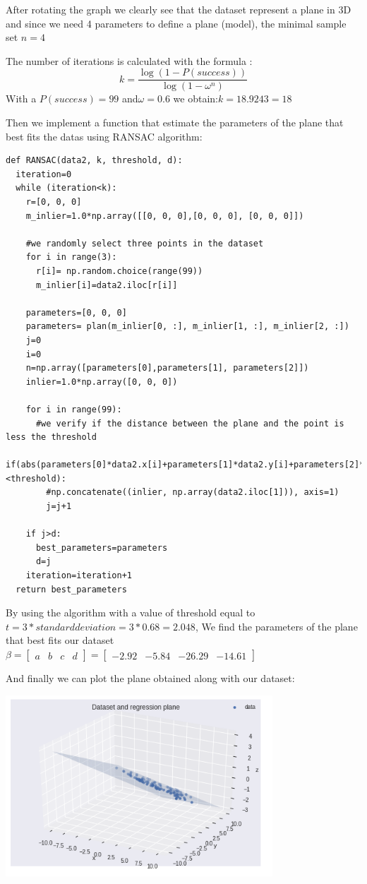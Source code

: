 \documentclass[12pt,a4paper]{report}
\begin{document}
After rotating the graph we clearly see that the dataset represent a plane in 3D and since we need 4 parameters to define a plane (model), the minimal sample set $ n = 4$ 

The number of iterations is calculated with the formula : 
$$  k=\frac{\log(1- P(success))}{\log(1- \omega^n)} $$
With a \quad $P(success)= 99$ \quad and\quad $ \omega  = 0.6$ \quad we obtain:\quad $ k = 18.9243 =18 $ 

Then we implement a function that estimate the parameters of the plane that best fits the datas using RANSAC algorithm:
\begin{verbatim}
def RANSAC(data2, k, threshold, d):  
  iteration=0
  while (iteration<k):
    r=[0, 0, 0]
    m_inlier=1.0*np.array([[0, 0, 0],[0, 0, 0], [0, 0, 0]])
    
    #we randomly select three points in the dataset
    for i in range(3): 
      r[i]= np.random.choice(range(99))
      m_inlier[i]=data2.iloc[r[i]]

    parameters=[0, 0, 0]
    parameters= plan(m_inlier[0, :], m_inlier[1, :], m_inlier[2, :])
    j=0
    i=0    
    n=np.array([parameters[0],parameters[1], parameters[2]])
    inlier=1.0*np.array([0, 0, 0])

    for i in range(99):
      #we verify if the distance between the plane and the point is less the threshold
      if(abs(parameters[0]*data2.x[i]+parameters[1]*data2.y[i]+parameters[2]*data2.z[i])/np.linalg.norm(n)<threshold):
        #np.concatenate((inlier, np.array(data2.iloc[1])), axis=1)    
        j=j+1
    
    if j>d:
      best_parameters=parameters
      d=j
    iteration=iteration+1
  return best_parameters
\end{verbatim}
By using the algorithm with a value of threshold equal to $t=3*standarddeviation =3* 0.68= 2.048 $, We find the parameters of the plane that best fits our dataset $\beta= \left[\begin{array}{cccc} a &b &c & d\end{array}\right]=\left[\begin{array}{cccc} -2.92 &-5.84 & -26.29 & -14.61\end{array}\right]$

And finally we can plot the plane obtained along with our dataset:

\begin{center}
\includegraphics[width=10cm]{Capture6.png}
\end{center}
\end{document}
